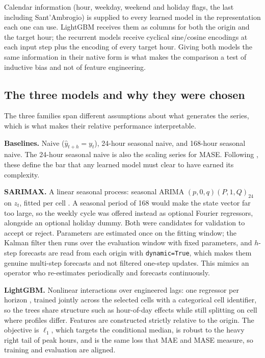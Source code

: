 \documentclass[conference,onecolumn,11pt]{IEEEtran}
\begin{document}
Calendar information (hour, weekday, weekend and holiday flags, the last including Sant'Ambrogio) is supplied to every learned model in the representation each one can use. LightGBM receives them as columns for both the origin and the target hour; the recurrent models receive cyclical sine/cosine encodings at each input step plus the encoding of every target hour. Giving both models the same information in their native form is what makes the comparison a test of inductive bias and not of feature engineering.

\subsection{The three models and why they were chosen}
The three families span different assumptions about what generates the series, which is what makes their relative performance interpretable.

\textbf{Baselines.} Naive ($\hat y_{t+h}=y_t$), 24-hour seasonal naive, and 168-hour seasonal naive. The 24-hour seasonal naive is also the scaling series for MASE. Following \cite{hyndman2021}, these define the bar that any learned model must clear to have earned its complexity.

\textbf{SARIMAX.} A linear seasonal process: seasonal ARIMA $(p,0,q)(P,1,Q)_{24}$ on $z_t$, fitted per cell \cite{seabold2010}. A seasonal period of 168 would make the state vector far too large, so the weekly cycle was offered instead as optional Fourier regressors, alongside an optional holiday dummy. Both were candidates for validation to accept or reject. Parameters are estimated once on the fitting window; the Kalman filter then runs over the evaluation window with fixed parameters, and $h$-step forecasts are read from each origin with \texttt{dynamic=True}, which makes them genuine multi-step forecasts and not filtered one-step updates. This mimics an operator who re-estimates periodically and forecasts continuously.

\textbf{LightGBM.} Nonlinear interactions over engineered lags: one regressor per horizon \cite{ke2017}, trained jointly across the selected cells with a categorical cell identifier, so the trees share structure such as hour-of-day effects while still splitting on cell where profiles differ. Features are constructed strictly relative to the origin. The objective is $\ell_1$, which targets the conditional median, is robust to the heavy right tail of peak hours, and is the same loss that MAE and MASE measure, so training and evaluation are aligned.
\end{document}
